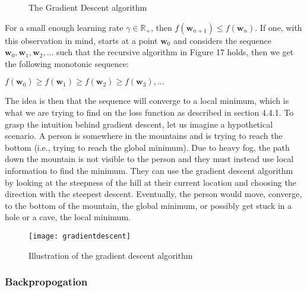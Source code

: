 \documentclass[titlepage]{article}
\begin{document}
\vskip 0.3cm

\begin{figure}[h]
    \centerline{}
    \vskip 0.2cm
    \caption{The Gradient Descent algorithm}
\end{figure}

\vskip 0.3cm

\noindent
For a small enough learning rate $\gamma \in \mathbb{R}_{+}$, then  $f(\mathbf{w}_{n+1}) \leq f(\mathbf{w}_{n})$. If one, with this observation in mind, starts at a point $\mathbf{w}_{0}$ and considers the sequence $\mathbf{w}_{0}, \mathbf{w}_{1}, \mathbf{w}_{2}, ...$ such that the recursive algorithm in Figure 17 holds, then we get the following monotonic sequence:

\vskip 0.5cm

\centerline{$f(\mathbf{w}_{0}) \geq f(\mathbf{w}_{1}) \geq f(\mathbf{w}_{2}) \geq f(\mathbf{w}_{3}), ...$}

\vskip 0.5cm

\noindent
The idea is then that the sequence will converge \cite{skansi} to a local minimum, which is what we are trying to find on the loss function as described in section 4.4.1. To grasp the intuition behind gradient descent, let us imagine a hypothetical scenario. A person is somewhere in the mountains and is trying to reach the bottom (i.e., trying to reach the global minimum). Due to heavy fog, the path down the mountain is not visible to the person and they must instead use local information to find the minimum. They can use the gradient descent algorithm by looking at the steepness of the hill at their current location and choosing the direction with the steepest descent. Eventually, the person would move, converge, to the bottom of the mountain, the global minimum, or possibly get stuck in a hole or a cave, the local minimum.

\begin{figure}[h]
    \center
    \texttt{[image: gradientdescent]}
    \caption{\scriptsize Illustration of the gradient descent algorithm}
\end{figure}

\newpage

\subsubsection{Backpropogation}

\vskip 0.2cm
\end{document}
